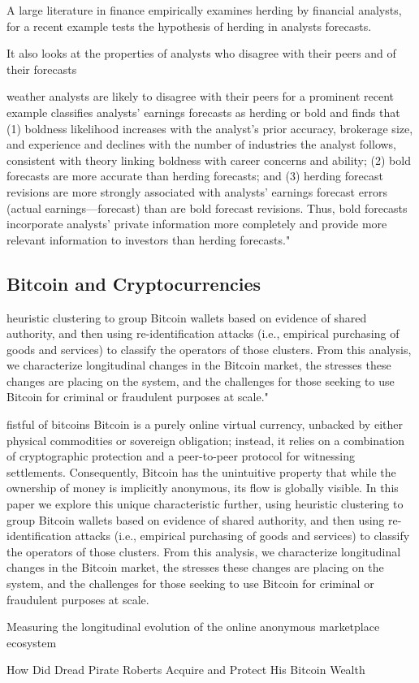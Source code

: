 A large literature in finance empirically examines herding by financial analysts, for a recent example\cite{jegadeesh2009analysts} tests the hypothesis of herding in analysts forecasts. 

It also looks at the properties of analysts who disagree with their peers and of their forecasts

 \cite{clement2005financial} 
weather analysts are likely to disagree with their peers for a prominent recent example classifies analysts' earnings forecasts as herding or bold and finds that (1) boldness likelihood increases with the analyst's prior accuracy, brokerage size, and experience and declines with the number of industries the analyst follows, consistent with theory linking boldness with career concerns and ability; (2) bold forecasts are more accurate than herding forecasts; and (3) herding forecast revisions are more strongly associated with analysts' earnings forecast errors (actual earnings—forecast) than are bold forecast revisions. Thus, bold forecasts incorporate analysts' private information more completely and provide more relevant information to investors than herding forecasts."


\subsection{Bitcoin and Cryptocurrencies}

\cite{bonneau2014mixcoin, ron2014did}


 heuristic clustering to group Bitcoin wallets based on evidence of shared authority, and then using re-identification attacks (i.e., empirical purchasing of goods and services) to classify the operators of those clusters. From this analysis, we characterize longitudinal changes in the Bitcoin market, the stresses these changes are placing on the system, and the challenges for those seeking to use Bitcoin for criminal or fraudulent purposes at scale." 

\cite{meiklejohn2013fistful}
fistful of bitcoins
Bitcoin is a purely online virtual currency, unbacked by either physical commodities or sovereign obligation; instead, it relies on a combination of cryptographic protection and a peer-to-peer protocol for witnessing settlements. Consequently, Bitcoin has the unintuitive property that while the ownership of money is implicitly anonymous, its flow is globally visible. In this paper we explore this unique characteristic further, using heuristic clustering to group Bitcoin wallets based on evidence of shared authority, and then using re-identification attacks (i.e., empirical purchasing of goods and services) to classify the operators of those clusters. From this analysis, we characterize longitudinal changes in the Bitcoin market, the stresses these changes are placing on the system, and the challenges for those seeking to use Bitcoin for criminal or fraudulent purposes at scale.

\cite{soska2015measuring}
Measuring the longitudinal evolution of the online anonymous marketplace ecosystem

\cite{ron2014did}
How Did Dread Pirate Roberts Acquire and Protect His Bitcoin Wealth
